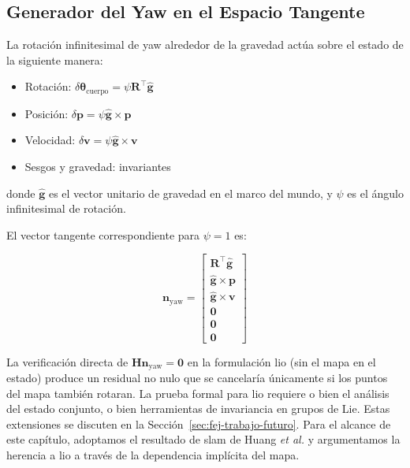 \subsection{Generador del Yaw en el Espacio Tangente}
\label{sec:fej-generador-yaw}

La rotación infinitesimal de yaw alrededor de la gravedad actúa sobre el estado
de la siguiente manera:

\begin{itemize}
    \item Rotación: $\delta\boldsymbol{\theta}_{\text{cuerpo}} = \psi \mathbf{R}^\top \hat{\mathbf{g}}$
    \item Posición: $\delta\mathbf{p} = \psi \hat{\mathbf{g}} \times \mathbf{p}$
    \item Velocidad: $\delta\mathbf{v} = \psi \hat{\mathbf{g}} \times \mathbf{v}$
    \item Sesgos y gravedad: invariantes
\end{itemize}

donde $\hat{\mathbf{g}}$ es el vector unitario de gravedad en el marco del
mundo, y $\psi$ es el ángulo infinitesimal de rotación.

El vector tangente correspondiente para $\psi = 1$ es:

\begin{equation}
\mathbf{n}_{\text{yaw}} =
\begin{bmatrix}
\mathbf{R}^\top \hat{\mathbf{g}} \\
\hat{\mathbf{g}} \times \mathbf{p} \\
\hat{\mathbf{g}} \times \mathbf{v} \\
\mathbf{0} \\
\mathbf{0} \\
\mathbf{0}
\end{bmatrix}
\label{eq:n-yaw}
\end{equation}

\begin{remark}
La verificación directa de $\mathbf{H} \mathbf{n}_{\text{yaw}} = \mathbf{0}$ en
la formulación \gls{lio} (sin el mapa en el estado) produce un residual no nulo
que se cancelaría únicamente si los puntos del mapa también rotaran. La prueba
formal para \gls{lio} requiere o bien el análisis del estado conjunto, o bien
herramientas de invariancia en grupos de Lie. Estas extensiones se discuten en
la Sección~\ref{sec:fej-trabajo-futuro}. Para el alcance de este capítulo,
adoptamos el resultado de \gls{slam} de Huang \emph{et al.} y argumentamos la
herencia a \gls{lio} a través de la dependencia implícita del mapa.
\end{remark}

